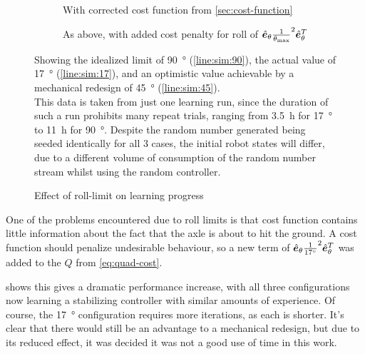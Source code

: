 \documentclass[main.tex]{subfiles}
\begin{document}
	\begin{figure}[b!]
		\begin{subfigure}[t]{\linewidth}
			\begin{minipage}{0.5\linewidth - 2em}
				
			\end{minipage}\hfill
			\begin{minipage}{0.5\linewidth - 2em}
				
			\end{minipage}
			\caption{With corrected cost function from \cref{sec:cost-function}}
			\label{fig:roll:progress:prev}
		\end{subfigure}
		\par\bigskip
		\begin{subfigure}[t]{\linewidth}
			\begin{minipage}{0.5\linewidth - 2em}
				
			\end{minipage}\hfill
			\begin{minipage}{0.5\linewidth - 2em}
				
			\end{minipage}
			\caption{As above, with added cost penalty for roll of $\hat{\bm{e}}_{\theta}\frac{1}{\theta_{\mathrm{max}}}^2\hat{\bm{e}}_{\theta}^T$}
			\label{fig:roll:progress:fixed}
		\end{subfigure}
		\caption{Effect of roll-limit on learning progress}
		\label{fig:roll:progress}
		\medskip
		\small
		Showing the idealized limit of \SI{90}{\degree} (\ref{line:sim:90}), the actual value of \SI{17}{\degree} (\ref{line:sim:17}), and an optimistic value achievable by a mechanical redesign of \SI{45}{\degree} (\ref{line:sim:45}).
		\medskip\\
		This data is taken from just one learning run, since the duration of such a run prohibits many repeat trials, ranging from \SI{3.5}{\hour} for \SI{17}{\degree} to \SI{11}{\hour} for \SI{90}{\degree}.
		Despite the random number generated being seeded identically for all 3 cases, the initial robot states will differ, due to a different volume of consumption of the random number stream whilst using the random controller.
	\end{figure}

	One of the problems encountered due to roll limits is that cost function contains little information about the fact that the axle is about to hit the ground.
	A cost function should penalize undesirable behaviour, so a new term of $\hat{\bm{e}}_{\theta}\frac{1}{\SI{17}{\degree}}^2\hat{\bm{e}}_{\theta}^T$ was added to the $Q$ from \cref{eq:quad-cost}.

	 shows this gives a dramatic performance increase, with all three configurations now learning a stabilizing controller with similar amounts of experience.
	Of course, the \SI{17}{\degree} configuration requires more iterations, as each is shorter.
	It's clear that there would still be an advantage to a mechanical redesign, but due to its reduced effect, it was decided it was not a good use of time in this work.

	\bib
\end{document}
